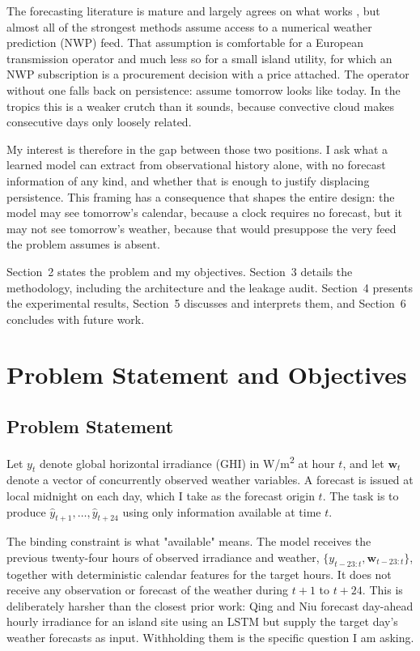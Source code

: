 \documentclass{article}
\begin{document}
The forecasting literature is mature and largely agrees on what works
\cite{yang2018history, inman2013solar}, but almost all of the strongest methods
assume access to a numerical weather prediction (NWP) feed. That assumption is
comfortable for a European transmission operator and much less so for a small
island utility, for which an NWP subscription is a procurement decision with a
price attached. The operator without one falls back on persistence: assume
tomorrow looks like today. In the tropics this is a weaker crutch than it sounds,
because convective cloud makes consecutive days only loosely related.

My interest is therefore in the gap between those two positions. I ask what a
learned model can extract from observational history alone, with no forecast
information of any kind, and whether that is enough to justify displacing
persistence. This framing has a consequence that shapes the entire design: the
model may see tomorrow's calendar, because a clock requires no forecast, but it
may not see tomorrow's weather, because that would presuppose the very feed the
problem assumes is absent.

Section~2 states the problem and my objectives. Section~3 details the
methodology, including the architecture and the leakage audit. Section~4 presents
the experimental results, Section~5 discusses and interprets them, and Section~6
concludes with future work.

\section{Problem Statement and Objectives}

\subsection{Problem Statement}

Let $y_t$ denote global horizontal irradiance (GHI) in W/m\textsuperscript{2} at
hour $t$, and let $\mathbf{w}_t$ denote a vector of concurrently observed weather
variables. A forecast is issued at local midnight on each day, which I take as
the forecast origin $t$. The task is to produce
$\hat{y}_{t+1}, \dots, \hat{y}_{t+24}$ using only information available at time
$t$.

The binding constraint is what "available" means. The model receives the previous
twenty-four hours of observed irradiance and weather, $\{y_{t-23:t},
\mathbf{w}_{t-23:t}\}$, together with deterministic calendar features for the
target hours. It does not receive any observation or forecast of the weather
during $t+1$ to $t+24$. This is deliberately harsher than the closest prior work:
Qing and Niu \cite{qing2018hourly} forecast day-ahead hourly irradiance for an
island site using an LSTM but supply the target day's weather forecasts as input.
Withholding them is the specific question I am asking.
\end{document}
